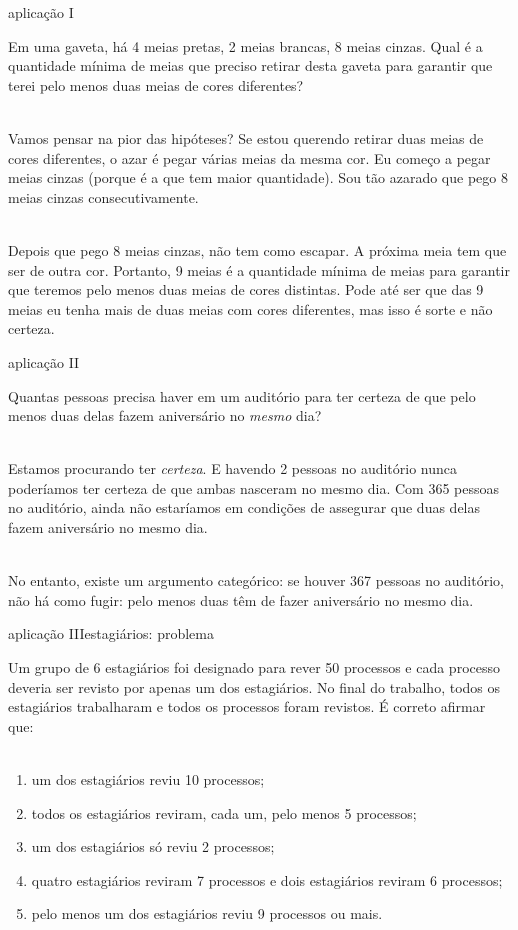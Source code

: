 \documentclass{beamer}
\begin{document}
\begin{frame}{aplicação I}

  Em uma gaveta, há 4 meias pretas, 2 meias brancas, 8 meias
  cinzas. Qual é a quantidade mínima de meias que preciso retirar
  desta gaveta para garantir que terei pelo menos duas meias de cores
  diferentes?\\~\

  Vamos pensar na pior das hipóteses? Se estou querendo retirar duas
  meias de cores diferentes, o azar é pegar várias meias da mesma
  cor. Eu começo a pegar meias cinzas (porque é a que tem maior
  quantidade). Sou tão azarado que pego 8 meias cinzas
  consecutivamente.\\~\

  Depois que pego 8 meias cinzas, não tem como escapar. A próxima meia
  tem que ser de outra cor. Portanto, 9 meias é a quantidade mínima de
  meias para garantir que teremos pelo menos duas meias de cores
  distintas. Pode até ser que das 9 meias eu tenha mais de duas meias
  com cores diferentes, mas isso é sorte e não certeza.
\end{frame}

\begin{frame}{aplicação II}

  Quantas pessoas precisa haver em um auditório para ter certeza de
  que pelo menos duas delas fazem aniversário no \emph{mesmo} dia?\\~\

  Estamos procurando ter \emph{certeza}. E havendo 2 pessoas no
  auditório nunca poderíamos ter certeza de que ambas nasceram no
  mesmo dia. Com 365 pessoas no auditório, ainda não estaríamos em
  condições de assegurar que duas delas fazem aniversário no mesmo
  dia. \\~\

  No entanto, existe um argumento categórico: se houver 367 pessoas no
  auditório, não há como fugir: pelo menos duas têm de fazer
  aniversário no mesmo dia.
\end{frame}

\begin{frame}{aplicação III}{estagiários: problema}

  Um grupo de 6 estagiários foi designado para rever 50 processos e
  cada processo deveria ser revisto por apenas um dos estagiários. No
  final do trabalho, todos os estagiários trabalharam e todos os
  processos foram revistos. É correto afirmar que:\\~\

  \begin{enumerate}
  \item um dos estagiários reviu 10 processos;
  \item todos os estagiários reviram, cada um, pelo menos 5 processos;
  \item um dos estagiários só reviu 2 processos;
  \item quatro estagiários reviram 7 processos e dois estagiários
    reviram 6 processos;
  \item pelo menos um dos estagiários reviu 9 processos ou mais.
  \end{enumerate}
\end{frame}
\end{document}
